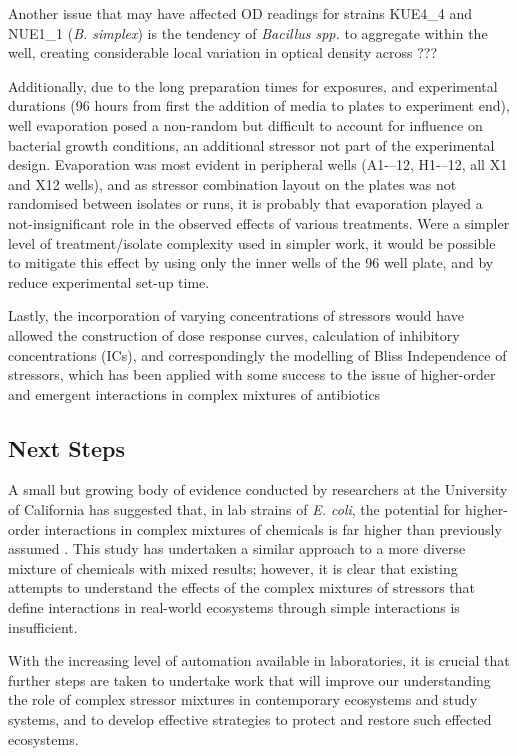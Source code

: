\documentclass[final,1p,times]{elsarticle}
\begin{document}
Another issue that may have affected OD readings for strains KUE4\_4 and NUE1\_1 (\textit{B. simplex}) is the tendency of \textit{Bacillus spp.} to aggregate within the well, creating considerable local variation in optical density across ???

Additionally, due to the long preparation times for exposures, and experimental durations (96 hours from first the addition of media to plates to experiment end), well evaporation posed a non-random but difficult to account for influence on bacterial growth conditions, an additional stressor not part of the experimental design. Evaporation was most evident in peripheral wells (A1-–12, H1-–12, all X1 and X12 wells), and as stressor combination layout on the plates was not randomised between isolates or runs, it is probably that evaporation played a not-insignificant role in the observed effects of various treatments. Were a simpler level of treatment/isolate complexity used in simpler work, it would be possible to mitigate this effect by using only the inner wells of the 96 well plate, and by reduce experimental set-up time. 

Lastly, the incorporation of varying concentrations of stressors would have allowed the construction of dose response curves, calculation of inhibitory concentrations (ICs), and correspondingly the modelling of Bliss Independence \cite{Bliss1939} of stressors, which has been applied with some success to the issue of higher-order and emergent interactions in complex mixtures of antibiotics \cite{Beppler2016,Tekin2017a} 
\subsection{Next Steps}
\label{S:4:4}

A small but growing body of evidence conducted by researchers at the University of California has suggested that, in lab strains of \textit{E. coli}, the potential for higher-order interactions in complex mixtures of chemicals is far higher than previously assumed \cite{Beppler2016,Tekin2016,Tekin2017a}.  This study has undertaken a similar approach to a more diverse mixture of chemicals with mixed results; however, it is clear that existing attempts to understand the effects of the complex mixtures of stressors that define interactions in real-world ecosystems through simple interactions is insufficient.

With the increasing level of automation available in laboratories, it is crucial that further steps are taken to undertake work that will improve our understanding the role of complex stressor mixtures in contemporary ecosystems and study systems, and to develop effective strategies to protect and restore such effected ecosystems.
\end{document}
